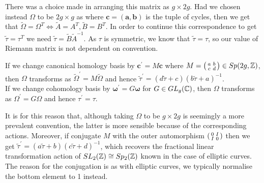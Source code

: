\documentclass{article}
\begin{document}
\begin{remark}
	There was a choice made in arranging this matrix as $g \times 2g$. Had we chosen instead $\Omega$ to be $2g \times g$ as 
	where $\bm{c} = (\bm{a},\bm{b})$ is the tuple of cycles, then we get that $\tilde{\Omega} = \Omega^T \Leftrightarrow \tilde{A}=A^T, \tilde{B} = B^T$. In order to continue this correspondence to get $\tilde{\tau} = \tau^T$ we need $\tilde{\tau} = \tilde{B} \tilde{A}^{-1}$. As $\tau$ is symmetric, we know that $\tilde{\tau} = \tau$, so our value of Riemann matrix is not dependent on convention. 
\end{remark}

\begin{lemma}
	If we change canonical homology basis by $\bm{c}^\prime = M \bm{c}$ where $M = \begin{psmallmatrix} a & b \\ c & d \end{psmallmatrix} \in Sp(2g,\mathbb{Z})$, then $\Omega$ transforms as $\tilde{\Omega}^\prime = M\tilde{\Omega}$ and hence $\tilde{\tau}^\prime = (d\tilde{\tau}+c)(b\tilde{\tau}+a)^{-1}$. \\
	If we change cohomology basis by $\bm{\omega}^\prime = G \bm{\omega}$ for $G \in GL_g(\mathbb{C})$, then $\Omega$ transforms as $\Omega^\prime = G\Omega$ and hence $\tau^\prime = \tau$.   
\end{lemma}
\begin{remark}
	It is for this reason that, although taking $\Omega$ to be $g \times 2g$ is seemingly a more prevalent convention, the latter is more sensible because of the corresponding actions. Moreover, if conjugate $M$ with the outer automorphism $\begin{psmallmatrix} 0 & I \\ I & 0 \end{psmallmatrix}$ then we get $\tilde{\tau}^\prime = (a\tilde{\tau}+b)(c\tilde{\tau}+d)^{-1}$, which recovers the fractional linear transformation action of $SL_2(\mathbb{Z}) \cong Sp_2(\mathbb{Z})$ known in the case of elliptic curves. The reason for the conjugation is as with elliptic curves, we typically normalise the bottom element to 1 instead. 
\end{remark}

\end{document}
